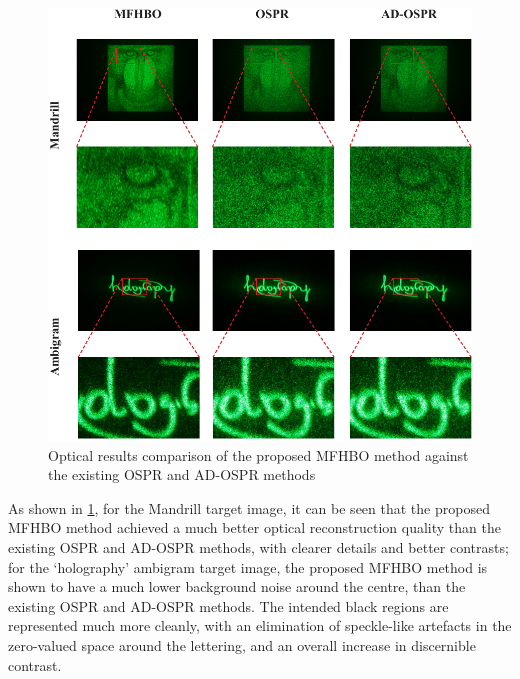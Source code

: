 	\begin{figure}[h!t]
		\centering
		\includegraphics[width=1.0\textwidth]{recon_quality_vs_OSPR_ADOSPR.pdf}
		\caption{Optical results comparison of the proposed MFHBO method against the existing OSPR and AD-OSPR methods}
		\label{fig:recon_quality_vs_OSPR_ADOSPR}
	\end{figure}
	
	As shown in \cref{fig:recon_quality_vs_OSPR_ADOSPR}, for the Mandrill target image, it can be seen that the proposed MFHBO method achieved a much better optical reconstruction quality than the existing OSPR and AD-OSPR methods, with clearer details and better contrasts; for the `holography' ambigram target image, the proposed MFHBO method is shown to have a much lower background noise around the centre, than the existing OSPR and AD-OSPR methods. The intended black regions are represented much more cleanly, with an elimination of speckle-like artefacts in the zero-valued space around the lettering, and an overall increase in discernible contrast. 
	
